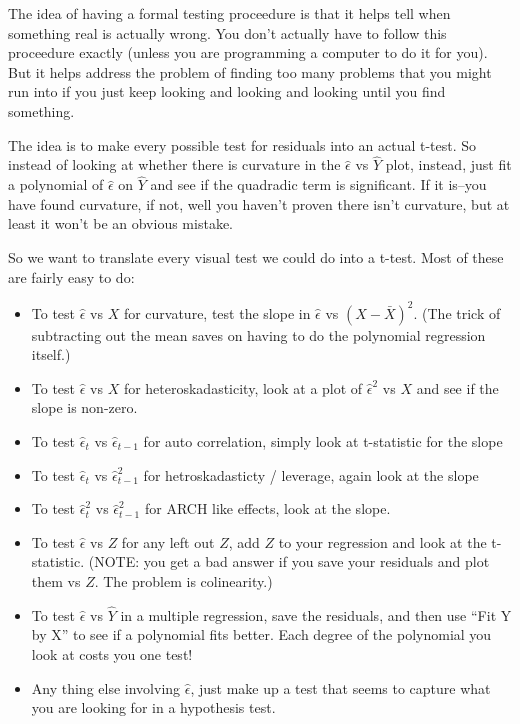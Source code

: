 \documentclass[12pt]{article}
\begin{document}
The idea of having a formal testing proceedure is that it helps tell
 when something real is actually wrong.  You don't actually have to
 follow this proceedure exactly (unless you are programming a computer
 to do it for you).  But it helps address the problem of finding too
many problems that you might run into if you just keep looking and
looking and looking until you find something.

The idea is to make every possible test for residuals into an actual
t-test.  So instead of looking at whether there is curvature in the
$\hat\epsilon$ vs $\hat Y$ plot, instead, just fit a polynomial of
$\hat\epsilon$ on $\hat Y$ and see if the quadradic term is
significant.  If it is--you have found curvature, if not, well you
haven't proven there isn't curvature, but at least it won't be an
obvious mistake.

So we want to translate every visual test we could do into a t-test.
Most of these are fairly easy to do:
\begin{itemize}
\item To test $\hat\epsilon$ vs $X$ for curvature, test the
slope in $\hat\epsilon$ vs $(X - \bar X)^2$.  (The trick of
subtracting out the mean saves on having to do the polynomial
regression itself.)
\item To test $\hat\epsilon$ vs $X$ for heteroskadasticity, look at a
plot of $\hat\epsilon^2$ vs $X$ and see if the slope is non-zero.
\item To test $\hat\epsilon_t$ vs $\hat\epsilon_{t-1}$ for auto
correlation, simply look at t-statistic for the slope
\item To test $\hat\epsilon_t$ vs $\hat\epsilon_{t-1}^2$ for
hetroskadasticty / leverage, again look at the slope
\item To test $\hat\epsilon_t^2$ vs $\hat\epsilon_{t-1}^2$ for ARCH
like effects, look at the slope.
\item To test $\hat\epsilon$ vs $Z$ for any left out $Z$, add $Z$ to
your regression and look at the t-statistic.  (NOTE: you get a bad
answer if you save your residuals and plot them vs $Z$.  The problem
is colinearity.)
\item To test $\hat\epsilon$ vs $\hat Y$ in a multiple regression,
save the residuals, and then use ``Fit Y by X'' to see if a polynomial
fits better.  Each degree of the polynomial you look at costs you one
test! 
\item Any thing else involving $\hat\epsilon$, just make up a test
that seems to capture what you are looking for in a hypothesis test.
\end{itemize}
\end{document}
